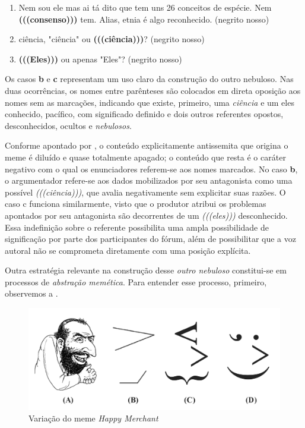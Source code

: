 \documentclass[portuguese]{textolivre}
\begin{document}
\begin{enumerate}[label=\alph*)]
    \item Nem sou ele mas ai tá dito que tem uns 26 conceitos de espécie. Nem \textbf{(((consenso)))} tem. Alias, etnia é algo reconhecido. (negrito nosso)
    \item ciência, "ciência" ou \textbf{(((ciência)))}? (negrito nosso)
    \item \textbf{(((Eles)))} ou apenas "Eles"? (negrito nosso)
\end{enumerate}

Os casos \textbf{b} e \textbf{c} representam um uso claro da construção do outro nebuloso. Nas duas ocorrências, os nomes entre parênteses são colocados em direta oposição aos nomes sem as marcações, indicando que existe, primeiro, uma \emph{ciência} e um eles conhecido, pacífico, com significado definido e dois outros referentes opostos, desconhecidos, ocultos e \emph{nebulosos}. 

Conforme apontado por \textcite{tutershagen2020they}, o conteúdo explicitamente antissemita que origina o meme é diluído e quase totalmente apagado; o conteúdo que resta é o caráter negativo com o qual os enunciadores referem-se aos nomes marcados. No caso \textbf{b}, o argumentador refere-se aos dados mobilizados por seu antagonista como uma possível \emph{(((ciência)))}, que avalia negativamente sem explicitar suas razões. O caso c funciona similarmente, visto que o produtor atribui os problemas apontados por seu antagonista são decorrentes de um \emph{(((eles)))} desconhecido. Essa indefinição sobre o referente possibilita uma ampla possibilidade de significação por parte dos participantes do fórum, além de possibilitar que a voz autoral não se comprometa diretamente com uma posição explícita.

Outra estratégia relevante na construção desse \emph{outro nebuloso} constitui-se em processos de \emph{abstração memética}. Para entender esse processo, primeiro, observemos a .

\begin{figure}[h!]
\centering
\begin{minipage}{.8\textwidth}
 \includegraphics[width=\textwidth]{image5.png}
 \caption{Variação do meme \emph{Happy Merchant}}
 \label{fig5}
\end{minipage}
\end{figure}
\end{document}
